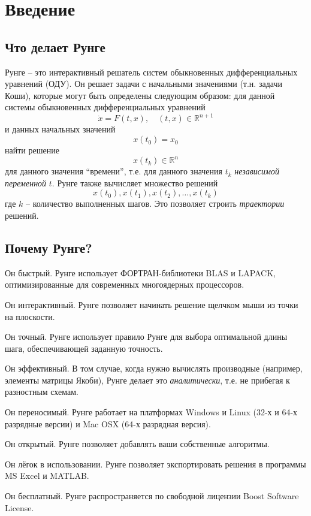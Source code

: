 \documentclass[12pt]{article}
\newcommand{\FORTRAN}{\textsf{ФОРТРАН}\xspace}
\begin{document}
{}

\section{Введение}
\subsection{Что делает Рунге}
Рунге -- это интерактивный решатель систем 
обыкновенных дифференциальных уравнений (ОДУ).
Он решает задачи с начальными значениями (т.н. задачи Коши),
которые могут быть определены следующим образом:
для данной системы обыкновенных дифференциальных уравнений
\[
\dot x=F(t,x),\quad (t,x)\in \mathbb R^{n+1}
\]
и данных начальных значений
\[
x(t_0)=x_0
\]
найти решение
\[
x(t_k)\in\mathbb R^n
\]
для данного значения ``времени'',
т.е. для данного значения \(t_k\) \textit{независимой переменной} \(t\). 
Рунге также вычисляет множество решений
\[
x(t_0),x(t_1),x(t_2),\dots,x(t_k)
\]
где \(k\) -- количество выполненных шагов. Это позволяет строить 
\textit{траектории} решений.


\subsection{Почему Рунге?}
\begin{compactitem}
\item Он быстрый. Рунге использует \FORTRAN-библиотеки BLAS и LAPACK, 
оптимизированные для современных многоядерных процессоров.
\item Он интерактивный. Рунге позволяет начинать решение щелчком мыши из точки на плоскости.
\item Он точный. Рунге использует правило Рунге для выбора оптимальной длины шага, обеспечивающей заданную точность.
\item Он эффективный. В том случае, когда нужно вычислять производные 
(например, элементы матрицы Якоби),
Рунге делает это \textit{аналитически}, т.е. не прибегая к разностным схемам.
\item Он переносимый. Рунге работает на платформах Windows и Linux (32-х и 64-х разрядные версии) и Mac OSX (64-х разрядная версия).
\item Он открытый. Рунге позволяет добавлять ваши собственные алгоритмы.
\item Он лёгок в использовании. Рунге позволяет экспортировать решения в программы MS Excel и MATLAB.
\item Он бесплатный. Рунге распространяется по свободной лицензии 
\Link[http://www.boost.org/LICENSE_1_0.txt target="_blank"]{}{}Boost Software License\EndLink.
\end{compactitem}
\end{document}
